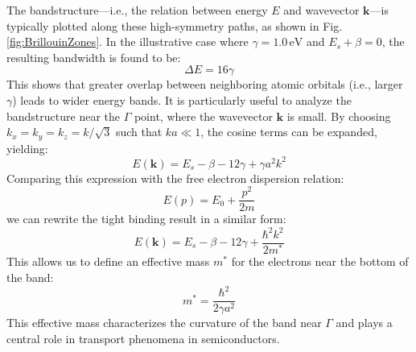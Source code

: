 The bandstructure—i.e., the relation between energy \( E \) and wavevector \( \mathbf{k} \)—is typically plotted along these high-symmetry paths, as shown in Fig.\ref{fig:BrillouinZones}. In the illustrative case where \( \gamma = 1.0\,\text{eV} \) and \( E_s + \beta = 0 \), the resulting bandwidth is found to be:
\begin{equation*}
	\Delta E = 16\gamma
\end{equation*}
This shows that greater overlap between neighboring atomic orbitals (i.e., larger \( \gamma \)) leads to wider energy bands.
It is particularly useful to analyze the bandstructure near the \( \Gamma \) point, where the wavevector \( \mathbf{k} \) is small. By choosing \( k_x = k_y = k_z = k/\sqrt{3} \) such that \( ka \ll 1 \), the cosine terms can be expanded, yielding:
\begin{equation}
	E(\mathbf{k}) = E_s - \beta - 12\gamma + \gamma a^2 k^2
\end{equation}
Comparing this expression with the free electron dispersion relation:
\begin{equation*}
	E(p) = E_0 + \frac{p^2}{2m}
\end{equation*}
\noindent
we can rewrite the tight binding result in a similar form:
\begin{equation*}
	E(\mathbf{k}) = E_s - \beta - 12\gamma + \frac{\hbar^2 k^2}{2 m^*}
\end{equation*}
This allows us to define an effective mass \( m^* \) for the electrons near the bottom of the band:
\begin{equation}
	m^* = \frac{\hbar^2}{2\gamma a^2}
\end{equation}
\noindent
This effective mass characterizes the curvature of the band near \( \Gamma \) and plays a central role in transport phenomena in semiconductors.
